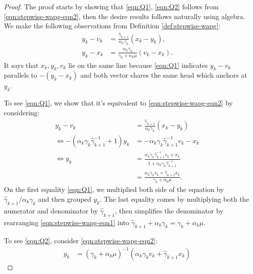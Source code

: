 \documentclass[12pt]{article}
\begin{document}
    \begin{proof}
        The proof starts by showing that \eqref{eqn:Q1}, \eqref{eqn:Q2} follows from \ref{eqn:stepwise-wapg-eqn2}, then the desire results follows naturally using algebra.
        We make the following observations from Definition \ref{def:stepwise-wapg}: 
        \begin{align*}
            y_k - v_k &= 
            \frac{\hat \gamma_{k + 1}}{\alpha_k \gamma_k}(x_k - y_k), 
            \tag{Q1}\label{eqn:Q1}
            \\
            y_k - x_k &= 
            \frac{\alpha_k \gamma_k}{\gamma_k + \alpha_k \mu}(v_k - x_k). 
            \tag{Q2}\label{eqn:Q2}
        \end{align*}
        It says that $x_k, y_k, v_k$ lie on the same line because \eqref{eqn:Q1} indicates $y_k - v_k$ parallels to $-(y_k - x_k)$ and both vector shares the same head which anchors at $y_k$. 
        \par
        To see \eqref{eqn:Q1}, we show that it's equivalent to \eqref{eqn:stepwise-wapg-eqn2} by considering: 
        \begin{align*}
            y_k - v_k &= 
            \frac{\hat \gamma_{k + 1}}{\alpha_k \gamma_k}(x_k - y_k)
            \\
            \iff 
            -(\alpha_k \gamma_k \hat \gamma^{-1}_{k + 1} + 1)y_k
            &= 
            - \alpha_k \gamma_k \hat \gamma^{-1}_{k + 1}v_k - x_k
            \\
            \iff 
            y_k &= 
            \frac{
                \alpha_k \gamma_k \hat \gamma_{k + 1}^{-1}v_k + x_k
            }{1 + \alpha_k \gamma_k \hat \gamma_{k + 1}^{-1}}
            \\
            &=  
            \frac{\alpha_k \gamma_k v_k + \hat \gamma_{k + 1} x_k}{\gamma_k + \alpha_k \mu}.
        \end{align*}
        On the first equality \eqref{eqn:Q1}, we multiplied both side of the equation by $\hat\gamma_{k + 1}/\alpha_k \gamma_k$ and then grouped $y_k$. 
        The last equality comes by multiplying both the numerator and denominator by $\hat \gamma_{k + 1}$, then simplifies the denominator by rearranging \eqref{eqn:stepwise-wapg-eqn1} into $\hat \gamma_{k + 1} + \alpha_k \gamma_k = \gamma_k + \alpha_k \mu$. 
        \par
        To see \eqref{eqn:Q2}, consider \eqref{eqn:stepwise-wapg-eqn2}: 
        \begin{align*}
            y_k &= (\gamma_k + \alpha_k \mu)^{-1}(\alpha_k \gamma_k v_k + \hat\gamma_{k + 1} x_k)

\end{align*}
\end{proof}
\end{document}
